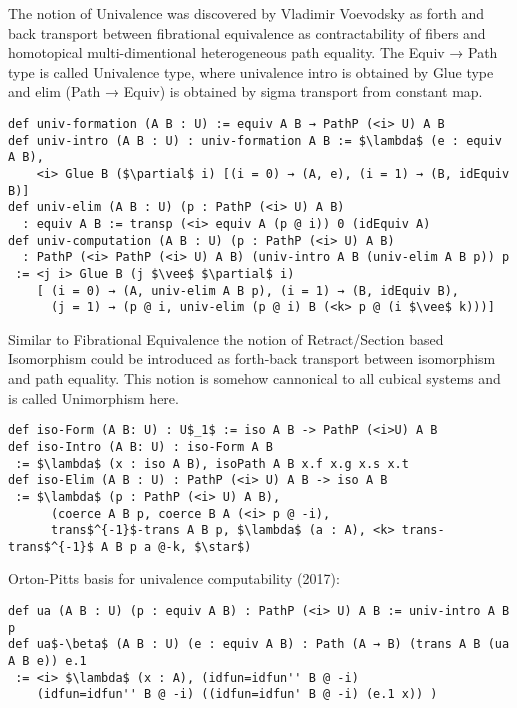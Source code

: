 \documentclass{article}
\theoremstyle{definition}
\begin{document}
The notion of Univalence was discovered by Vladimir Voevodsky
as forth and back transport between fibrational equivalence
as contractability of fibers and homotopical multi-dimentional
heterogeneous path equality. The Equiv → Path type is called Univalence type,
where univalence intro is obtained by Glue type and elim (Path → Equiv) is
obtained by sigma transport from constant map.

\begin{lstlisting}[mathescape=true]
def univ-formation (A B : U) := equiv A B → PathP (<i> U) A B
def univ-intro (A B : U) : univ-formation A B := $\lambda$ (e : equiv A B),
    <i> Glue B ($\partial$ i) [(i = 0) → (A, e), (i = 1) → (B, idEquiv B)]
def univ-elim (A B : U) (p : PathP (<i> U) A B)
  : equiv A B := transp (<i> equiv A (p @ i)) 0 (idEquiv A)
def univ-computation (A B : U) (p : PathP (<i> U) A B)
  : PathP (<i> PathP (<i> U) A B) (univ-intro A B (univ-elim A B p)) p
 := <j i> Glue B (j $\vee$ $\partial$ i)
    [ (i = 0) → (A, univ-elim A B p), (i = 1) → (B, idEquiv B),
      (j = 1) → (p @ i, univ-elim (p @ i) B (<k> p @ (i $\vee$ k)))]
\end{lstlisting}

Similar to Fibrational Equivalence the notion of Retract/Section based Isomorphism could be introduced
as forth-back transport between isomorphism and path equality. This notion is somehow cannonical to all
cubical systems and is called Unimorphism here.

\begin{lstlisting}[mathescape=true]
def iso-Form (A B: U) : U$_1$ := iso A B -> PathP (<i>U) A B
def iso-Intro (A B: U) : iso-Form A B
 := $\lambda$ (x : iso A B), isoPath A B x.f x.g x.s x.t
def iso-Elim (A B : U) : PathP (<i> U) A B -> iso A B
 := $\lambda$ (p : PathP (<i> U) A B),
      (coerce A B p, coerce B A (<i> p @ -i),
      trans$^{-1}$-trans A B p, $\lambda$ (a : A), <k> trans-trans$^{-1}$ A B p a @-k, $\star$)
\end{lstlisting}

Orton-Pitts basis for univalence computability (2017):

\begin{lstlisting}[mathescape=true]
def ua (A B : U) (p : equiv A B) : PathP (<i> U) A B := univ-intro A B p
def ua$-\beta$ (A B : U) (e : equiv A B) : Path (A → B) (trans A B (ua A B e)) e.1
 := <i> $\lambda$ (x : A), (idfun=idfun'' B @ -i)
    (idfun=idfun'' B @ -i) ((idfun=idfun' B @ -i) (e.1 x)) )
\end{lstlisting}
\end{document}
